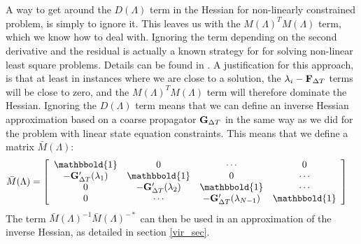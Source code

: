 \documentclass[11pt,a4paper]{article}
\begin{document}
\\
\\
A way to get around the $D(\Lambda)$ term in the Hessian for non-linearly constrained problem, is simply to ignore it. This leaves us with the $M(\Lambda)^TM(\Lambda)$ term, which we know how to deal with. Ignoring the term depending on the second derivative and the residual is actually a known strategy for for solving non-linear least square problems. Details can be found in \cite{nocedal2006numerical}. A justification for this approach, is that at least in instances where we are close to a solution, the $\lambda_i-\bold F_{\Delta T}$ terms will be close to zero, and the $M(\Lambda)^TM(\Lambda)$ term will therefore dominate the Hessian. Ignoring the $D(\Lambda)$ term means that we can define an inverse Hessian approximation based on a coarse propagator $\bold G_{\Delta T}$ in the same way as we did for the problem with linear state equation constraints. This means that we define a matrix $\bar M(\Lambda)$:
\begin{align*}
\bar M(\Lambda) &= \left[ \begin{array}{cccc}
   \mathbbold{1} & 0 & \cdots & 0 \\  
   -\bold{G}_{\Delta T}'(\lambda_{1}) & \mathbbold{1} & 0 & \cdots \\ 
   0 &-\bold{G}_{\Delta T}'(\lambda_{2}) & \mathbbold{1}  & \cdots \\
   0 &\cdots &-\bold{G}_{\Delta T}'(\lambda_{N-1}) & \mathbbold{1}  \\
   \end{array}  \right]
\end{align*}
The term $\bar{M}(\Lambda)^{-1}\bar{M}(\Lambda)^{-*}$ can then be used in an approximation of the inverse Hessian, as detailed in section \ref{vir_sec}.
\end{document}
